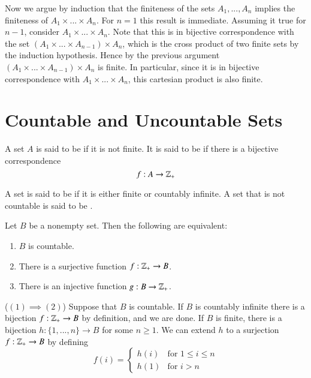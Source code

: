 \documentclass[12pt, a4paper, twoside, openright, titlepage]{book}
\begin{document}
\begin{appendices}
\begin{proof*}{}{}
        Now we argue by induction that the finiteness of the sets $A_1,...,A_n$ implies the finiteness of $A_1\times ...\times A_n$. For $n = 1$ this result is immediate. Assuming it true for $n-1$, consider $A_1\times ... \times A_n$. Note that this is in bijective correspondence with the set $(A_1\times ... \times A_{n-1})\times A_n$, which is the cross product of two finite sets by the induction hypothesis. Hence by the previous argument $(A_1\times ... \times A_{n-1})\times A_n$ is finite. In particular, since it is in bijective correspondence with $A_1\times ... \times A_n$, this cartesian product is also finite.
    \end{proof*}



    \section{Countable and Uncountable Sets}

    
    \begin{defn}{}{}
        A set $A$ is said to be  if it is not finite. It is said to be  if there is a bijective correspondence \begin{equation*}
            f:A\rightarrow \mathbb Z_+
        \end{equation*}
    \end{defn}


    \begin{defn}{}{}
        A set is said to be  if it is either finite or countably infinite. A set that is not countable is said to be .
    \end{defn}

    \begin{thm}{}{}
        Let $B$ be a nonempty set. Then the following are equivalent:\begin{enumerate}
            \item $B$ is countable.
            \item There is a surjective function $f:\mathbb Z_+\rightarrow B$.
            \item There is an injective function $g:B\rightarrow \mathbb Z_+$.
        \end{enumerate}
    \end{thm}
    \begin{proof*}{}{}
        ($(1)\implies(2)$) Suppose that $B$ is countable. If $B$ is countably infinite there is a bijection $f:\mathbb Z_+\rightarrow B$ by definition, and we are done. If $B$ is finite, there is a bijection $h:\{1,...,n\}\rightarrow B$ for some $n \geq 1$. We can extend $h$ to a surjection $f:\mathbb Z_+\rightarrow B$ by defining \begin{equation*}
            f(i) = \left\{\begin{array}{ll} h(i) & \text{for } 1\leq i \leq n \\
            h(1) & \text{for } i > n \end{array}\right.
        \end{equation*}


\end{proof*}
\end{appendices}
\end{document}
